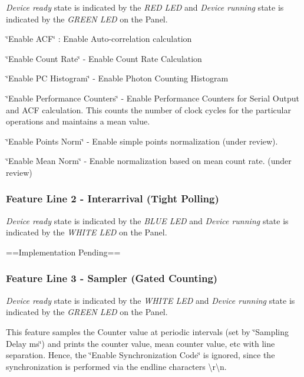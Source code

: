 {\itshape Device ready} state is indicated by the {\itshape R\+ED L\+ED} and {\itshape Device running} state is indicated by the {\itshape G\+R\+E\+EN L\+ED} on the Panel.


\begin{DoxyItemize}
\item {\ttfamily \char`\"{}\+Enable A\+C\+F\char`\"{}} \+: Enable Auto-\/correlation calculation
\item {\ttfamily \char`\"{}\+Enable Count Rate\char`\"{}} -\/ Enable Count Rate Calculation
\item {\ttfamily \char`\"{}\+Enable P\+C Histogram\char`\"{}} -\/ Enable Photon Counting Histogram
\item {\ttfamily \char`\"{}\+Enable Performance Counters\char`\"{}} -\/ Enable Performance Counters for Serial Output and A\+CF calculation. This counts the number of clock cycles for the particular operations and maintains a mean value. 


\item {\ttfamily \char`\"{}\+Enable Points Norm\char`\"{}} -\/ Enable simple points normalization (under review).
\item {\ttfamily \char`\"{}\+Enable Mean Norm\char`\"{}} -\/ Enable normalization based on mean count rate. (under review)
\end{DoxyItemize}

\subsubsection*{Feature Line 2 -\/ {\ttfamily Interarrival} (Tight Polling)}

{\itshape Device ready} state is indicated by the {\itshape B\+L\+UE L\+ED} and {\itshape Device running} state is indicated by the {\itshape W\+H\+I\+TE L\+ED} on the Panel.

==Implementation Pending==

\subsubsection*{Feature Line 3 -\/ {\ttfamily Sampler} (Gated Counting)}

{\itshape Device ready} state is indicated by the {\itshape W\+H\+I\+TE L\+ED} and {\itshape Device running} state is indicated by the {\itshape G\+R\+E\+EN L\+ED} on the Panel.

This feature samples the Counter value at periodic intervals (set by {\ttfamily \char`\"{}\+Sampling Delay ms\char`\"{}}) and prints the counter value, mean counter value, etc with line separation. Hence, the {\ttfamily \char`\"{}\+Enable Synchronization Code\char`\"{}} is ignored, since the synchronization is performed via the endline characters {\ttfamily \textbackslash{}r\textbackslash{}n}.

